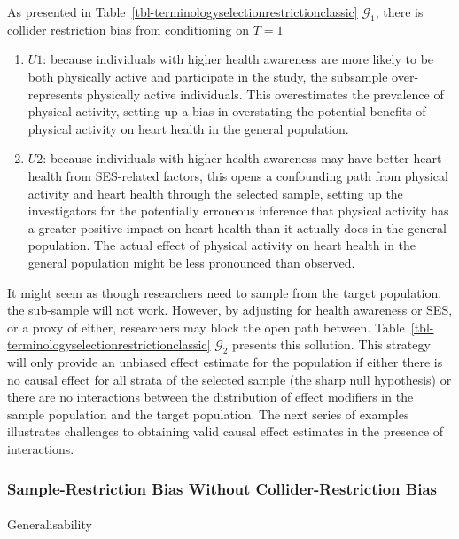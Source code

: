 \documentclass[
  single column]{article}
\makeatletter
\let\oldparagraph\paragraph
\renewcommand{\paragraph}{
    \@ifstar
      \xxxParagraphStar
      \xxxParagraphNoStar
  }
\newcommand{\xxxParagraphStar}[1]{\oldparagraph*{#1}\mbox{}}
\newcommand{\xxxParagraphNoStar}[1]{\oldparagraph{#1}\mbox{}}
\makeatother
\begin{document}
As presented in Table~\ref{tbl-terminologyselectionrestrictionclassic}
\(\mathcal{G}_1\), there is collider restriction bias from conditioning
on \(T=1\)

\begin{enumerate}
\def\labelenumi{\arabic{enumi}.}
\item
  \textbf{\(U1\)}: because individuals with higher health awareness are
  more likely to be both physically active and participate in the study,
  the subsample over-represents physically active individuals. This
  overestimates the prevalence of physical activity, setting up a bias
  in overstating the potential benefits of physical activity on heart
  health in the general population.
\item
  \textbf{\(U2\)}: because individuals with higher health awareness may
  have better heart health from SES-related factors, this opens a
  confounding path from physical activity and heart health through the
  selected sample, setting up the investigators for the potentially
  erroneous inference that physical activity has a greater positive
  impact on heart health than it actually does in the general
  population. The actual effect of physical activity on heart health in
  the general population might be less pronounced than observed.
\end{enumerate}

It might seem as though researchers need to sample from the target
population, the sub-sample will not work. However, by adjusting for
health awareness or SES, or a proxy of either, researchers may block the
open path between.
Table~\ref{tbl-terminologyselectionrestrictionclassic} \(\mathcal{G}_2\)
presents this sollution. This strategy will only provide an unbiased
effect estimate for the population if either there is no causal effect
for all strata of the selected sample (the sharp null hypothesis) or
there are no interactions between the distribution of effect modifiers
in the sample population and the target population. The next series of
examples illustrates challenges to obtaining valid causal effect
estimates in the presence of interactions.

\subsubsection{Sample-Restriction Bias Without Collider-Restriction
Bias}\label{sample-restriction-bias-without-collider-restriction-bias}

\paragraph{Generalisability}\label{generalisability}
\end{document}
